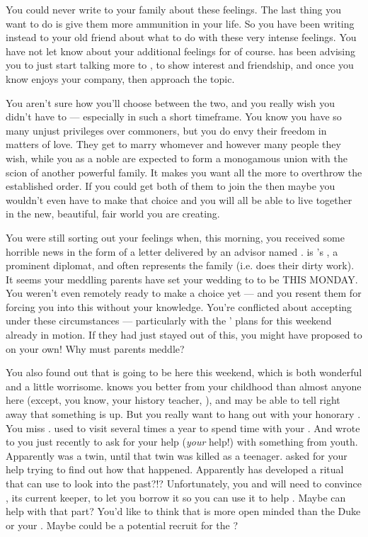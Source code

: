 \documentclass[char]{GL2020}
\begin{document}
You could never write to your family about these feelings.  The last thing you want to do is give them more ammunition in your life.  So you have been writing instead to your old friend \cWildCard{} about what to do with these very intense feelings.  You have not let \cWildCard{} know about your additional feelings for \cPresident{} of course.  \cWildCard{} has been advising you to just start talking more to \cHeir{}, to show interest and friendship, and once you know \cHeir{} enjoys your company, then approach the topic.  

You aren't sure how you'll choose between the two, and you really wish you didn't have to — especially in such a short timeframe. You know you have so many unjust privileges over commoners, but you do envy their freedom in matters of love. They get to marry whomever and however many people they wish, while you as a noble are expected to form a monogamous union with the scion of another powerful family. It makes you want all the more to overthrow the established order. If you could get both of them to join the \pGoaties{} then maybe you wouldn’t even have to make that choice and you will all be able to live together in the new, beautiful, fair world you are creating.
 
You were still sorting out your feelings when, this morning, you received some horrible news in the form of a letter delivered by an advisor named \cDiplomat{\full}. \cDiplomat{} is \cHeir{}’s \cDiplomat{\auncle}, a prominent diplomat, and often represents the family (i.e. does their dirty work). It seems your meddling parents have set your wedding to \cHeir{} to be THIS MONDAY. You weren't even remotely ready to make a choice yet — and you resent them for forcing you into this without your knowledge. You're conflicted about accepting under these circumstances — particularly with the \pGoaties{}’ plans for this weekend already in motion. If they had just stayed out of this, you might have proposed to \cHeir{} on your own!  Why must parents meddle?

You also found out that \cWildCard{} is going to be here this weekend, which is both wonderful and a little worrisome. \cWildCard{} knows you better from your childhood than almost anyone here (except, you know, your history teacher, \cHistory{}), and may be able to tell right away that something is up. But you really want to hang out with your honorary \cWildCard{\auncle}. You miss \cWildCard{\them}. \cWildCard{\They} used to visit several times a year to spend time with your \cWildCardFriend{\parent}. And \cWildCard{\they} wrote to you just recently to ask for your help (\emph{your} help!) with something from \cWildCard{\their} youth. Apparently \cWildCard{} was a twin, until that twin was killed as a teenager. \cWildCard{\Theyhave} asked for your help trying to find out how that happened. Apparently \cWildCard{} has developed a ritual that can use \iMirror{} to look into the past?!? Unfortunately, you and \cWildCard{} will need to convince \cDiplomat{}, its current keeper,  to let you borrow it so you can use it to help \cWildCard{}. Maybe \cHeir{} can help with that part? You’d like to think that \cWildCard{} is more open minded than the Duke or your \cWildCardFriend{\parent}. Maybe \cWildCard{} could be a potential recruit for the \pGoaties{}?  
\end{document}
